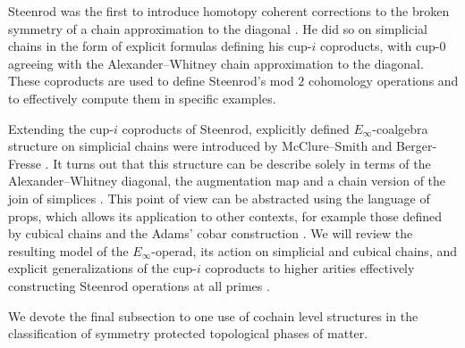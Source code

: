Steenrod was the first to introduce homotopy coherent corrections to the broken symmetry of a chain approximation to the diagonal \cite{steenrod1947products}.
He did so on simplicial chains in the form of explicit formulas defining his cup-$i$ coproducts, with \mbox{cup-$0$} agreeing with the Alexander--Whitney chain approximation to the diagonal.
These coproducts are used to define Steenrod's mod $2$ cohomology operations and to effectively compute them in specific examples.

Extending the cup-$i$ coproducts of Steenrod, explicitly defined $E_\infty$-coalgebra structure on simplicial chains were introduced by McClure--Smith \cite{mcclure2003multivariable} and Berger\-- Fresse \cite{berger2004combinatorial}.
It turns out that this structure can be describe solely in terms of the Alexander--Whitney diagonal, the augmentation map and a chain version of the join of simplices \cite{medina2020prop1}.
This point of view can be abstracted using the language of props, which allows its application to other contexts, for example those defined by cubical chains \cite{medina2021cubical} and the Adams' cobar construction \cite{medina2021cobar}.
We will review the resulting model of the $E_\infty$-operad, its action on simplicial and cubical chains, and explicit generalizations of the cup-$i$ coproducts to higher arities effectively constructing Steenrod operations at all primes \cite{medina2021maysteenrod}.

We devote the final subsection to one use of cochain level structures in the classification of symmetry protected topological phases of matter.

